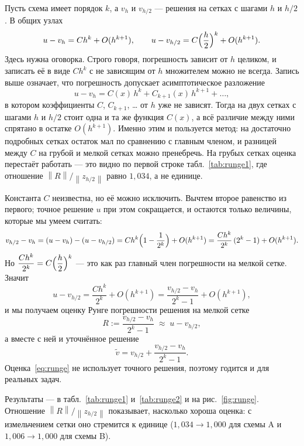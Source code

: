 \documentclass[12pt,a4paper]{article}
\newcommand{\norm}[1]{\left\|#1\right\|}
\begin{document}
Пусть схема имеет порядок $k$, а $v_h$ и $v_{h/2}$ --- решения на сетках
с шагами $h$ и $h/2$. В общих узлах
\[
u-v_h = C h^k+O(h^{k+1}),\qquad
u-v_{h/2} = C\Bigl(\frac h2\Bigr)^{k}+O(h^{k+1}).
\]
Здесь нужна оговорка. Строго говоря, погрешность зависит от $h$ целиком,
и записать её в виде $Ch^k$ с не зависящим от $h$ множителем можно не
всегда. Запись выше означает, что погрешность допускает асимптотическое
разложение
\begin{equation}\label{eq:expansion}
u-v_h=C(x)\,h^k+C_{k+1}(x)\,h^{k+1}+\dots,
\end{equation}
в котором коэффициенты $C$, $C_{k+1}$, \dots{} от $h$ уже не зависят.
Тогда на двух сетках с шагами $h$ и $h/2$ стоит одна и та же функция
$C(x)$, а всё различие между ними спрятано в остатке $O(h^{k+1})$. Именно
этим и пользуется метод: на достаточно подробных сетках остаток мал по
сравнению с главным членом, и разницей между $C$ на грубой и мелкой
сетках можно пренебречь. На грубых сетках оценка перестаёт работать ---
это видно по первой строке табл.~\ref{tab:runge1}, где отношение
$\norm{R}/\norm{z_{h/2}}$ равно $1{,}034$, а не единице.

Константа $C$ неизвестна, но её можно исключить. Вычтем второе равенство
из первого; точное решение $u$ при этом сокращается, и остаются только
величины, которые мы умеем считать:
\[
v_{h/2}-v_h=(u-v_h)-(u-v_{h/2})
 =Ch^k\Bigl(1-\frac1{2^k}\Bigr)+O(h^{k+1})
 =\frac{Ch^k}{2^k}\,(2^k-1)+O(h^{k+1}).
\]
Но $\dfrac{Ch^k}{2^k}=C\Bigl(\dfrac h2\Bigr)^{k}$ --- это как раз главный
член погрешности на мелкой сетке. Значит
\[
u-v_{h/2}=\frac{Ch^k}{2^k}+O(h^{k+1})
         =\frac{v_{h/2}-v_h}{2^k-1}+O(h^{k+1}),
\]
и мы получаем оценку Рунге погрешности решения на мелкой сетке
\begin{equation}\label{eq:runge}
R:=\frac{v_{h/2}-v_h}{2^k-1}\;\approx\; u-v_{h/2},
\end{equation}
а вместе с ней и уточнённое решение
\begin{equation}\label{eq:rich}
\tilde v = v_{h/2}+\frac{v_{h/2}-v_h}{2^k-1}.
\end{equation}
Оценка~\eqref{eq:runge} не использует точного решения, поэтому годится и
для реальных задач.

Результаты --- в табл.~\ref{tab:runge1} и~\ref{tab:runge2} и на
рис.~\ref{fig:runge}. Отношение $\norm{R}/\norm{z_{h/2}}$ показывает,
насколько хороша оценка: с измельчением сетки оно стремится к единице
($1{,}034\to1{,}000$ для схемы A и $1{,}006\to1{,}000$ для схемы B).
\end{document}
